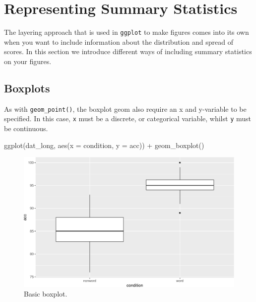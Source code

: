 \documentclass[
  english,
  doc,floatsintext]{apa6}
\newenvironment{Shaded}{\begin{snugshade}}{\end{snugshade}}
\newcommand{\AttributeTok}[1]{\textcolor[rgb]{0.77,0.63,0.00}{#1}}
\newcommand{\FunctionTok}[1]{\textcolor[rgb]{0.00,0.00,0.00}{#1}}
\newcommand{\NormalTok}[1]{#1}
\newcommand{\SpecialCharTok}[1]{\textcolor[rgb]{0.00,0.00,0.00}{#1}}
\begin{document}
\hypertarget{representing-summary-statistics}{%
\section{Representing Summary Statistics}\label{representing-summary-statistics}}

The layering approach that is used in \texttt{ggplot} to make figures comes into its own when you want to include information about the distribution and spread of scores. In this section we introduce different ways of including summary statistics on your figures.

\hypertarget{boxplots}{%
\subsection{Boxplots}\label{boxplots}}

As with \texttt{geom\_point()}, the boxplot geom also require an x and y-variable to be specified. In this case, \texttt{x} must be a discrete, or categorical variable, whilst \texttt{y} must be continuous.

\begin{Shaded}
\begin{Highlighting}[]
\FunctionTok{ggplot}\NormalTok{(dat\_long, }\FunctionTok{aes}\NormalTok{(}\AttributeTok{x =}\NormalTok{ condition, }\AttributeTok{y =}\NormalTok{ acc)) }\SpecialCharTok{+}
  \FunctionTok{geom\_boxplot}\NormalTok{()}
\end{Highlighting}
\end{Shaded}

\begin{figure}

{\centering \includegraphics[width=1\linewidth]{images/boxplot1-1} 

}

\caption{Basic boxplot.}\label{fig:boxplot1}
\end{figure}
\end{document}
